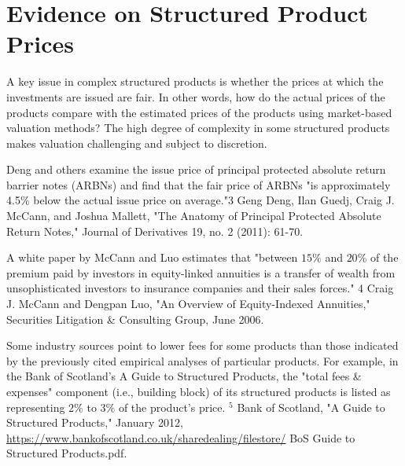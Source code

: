 \documentclass[11pt]{article}
\begin{document}
\section*{Evidence on Structured Product Prices}
A key issue in complex structured products is whether the prices at which the investments are issued are fair. In other words, how do the actual prices of the products compare with the estimated prices of the products using market-based valuation methods? The high degree of complexity in some structured products makes valuation challenging and subject to discretion.

Deng and others examine the issue price of principal protected absolute return barrier notes (ARBNs) and find that the fair price of ARBNs "is approximately 4.5\% below the actual issue price on average."3 Geng Deng, Ilan Guedj, Craig J. McCann, and Joshua Mallett, "The Anatomy of Principal Protected Absolute Return Notes," Journal of Derivatives 19, no. 2 (2011): 61-70.

A white paper by McCann and Luo estimates that "between $15 \%$ and $20 \%$ of the premium paid by investors in equity-linked annuities is a transfer of wealth from unsophisticated investors to insurance companies and their sales forces." 4 Craig J. McCann and Dengpan Luo, "An Overview of Equity-Indexed Annuities," Securities Litigation \& Consulting Group, June 2006.

Some industry sources point to lower fees for some products than those indicated by the previously cited empirical analyses of particular products. For example, in the Bank of Scotland's A Guide to Structured Products, the "total fees \& expenses" component (i.e., building block) of its structured products is listed as representing $2 \%$ to $3 \%$ of the product's price. ${ }^{5}$ Bank of Scotland, "A Guide to Structured Products," January 2012, \href{https://www.bankofscotland.co.uk/sharedealing/filestore/}{https://www.bankofscotland.co.uk/sharedealing/filestore/} BoS Guide to Structured Products.pdf.
\end{document}
